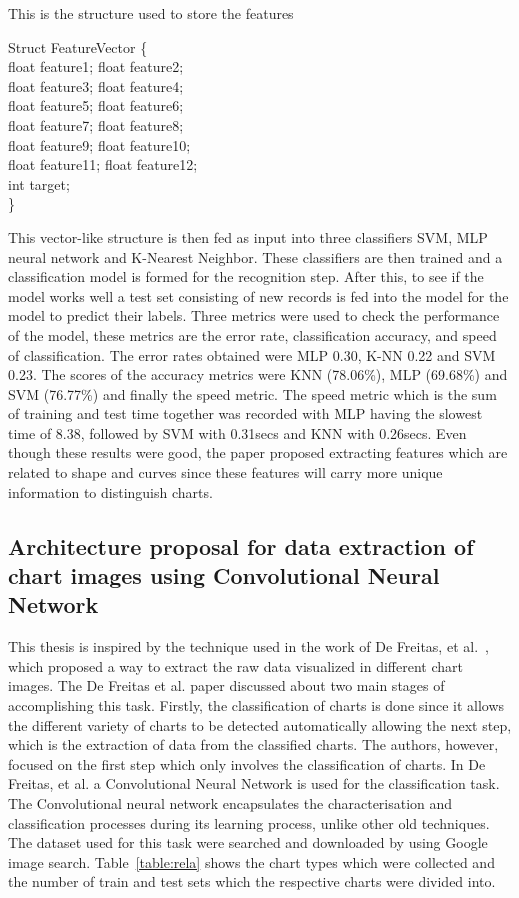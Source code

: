 \documentclass[12pt, a4paper,oneside]{report}
\begin{document}
\begin{algorithm}
\caption{This is the structure used to store the features}
\label{alg:1}
Struct FeatureVector \{\\
	float feature1; float feature2;\\
	float feature3; float feature4;\\
	float feature5; float feature6;\\
	float feature7; float feature8;\\
	float feature9; float feature10;\\
	float feature11; float feature12;\\
	int target;\\
\}
\end{algorithm}

This vector-like structure is then fed as input into three classifiers SVM, MLP neural network and K-Nearest Neighbor. These classifiers are then trained and a classification model is formed for the recognition step. After this, to see if the model works well a test set consisting of new records is fed into the model for the model to predict their labels. Three metrics were used to check the performance of the model, these metrics are  the error rate, classification accuracy, and speed of classification. The error rates obtained were MLP 0.30, K-NN 0.22 and SVM 0.23. The scores of the accuracy metrics were KNN (78.06\%), MLP (69.68\%) and SVM (76.77\%) and finally the speed metric. The speed metric which is the sum of training and test time together was recorded with MLP having the slowest time of 8.38, followed by SVM with 0.31secs and KNN with 0.26secs. Even though these results were good, the paper proposed extracting features which are related to shape and curves since these features will carry more unique information to distinguish charts.

\subsection{Architecture proposal for data extraction of chart images using Convolutional Neural Network}
This thesis is inspired by the technique used in the work of De Freitas, et al.~\cite{junior2017archi}, which proposed a way to extract the raw data visualized in different chart images. The De Freitas et al. paper discussed about two main stages of accomplishing this task. Firstly, the classification of charts is done since it allows the different variety of charts to be detected automatically allowing the next step, which is the extraction of data from the classified charts. The authors, however, focused on the first step which only involves the classification of charts. In De Freitas, et al. a Convolutional Neural Network is used for the classification task. The Convolutional neural network encapsulates the characterisation and classification processes during its learning process, unlike other old techniques. The dataset used for this task were searched and downloaded by using Google image search. Table~\ref{table:rela} shows the chart types which were collected and the number of train and test sets which the respective charts were divided into.
\end{document}

